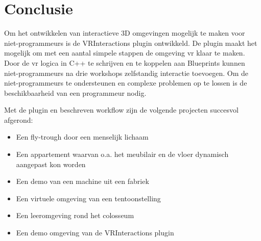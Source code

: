 \chapter{Conclusie}
\label{ch:conclusie}

Om het ontwikkelen van interactieve 3D omgevingen mogelijk te maken voor niet-programmeurs is de VRInteractions plugin ontwikkeld. De plugin maakt het mogelijk om met een aantal simpele stappen de omgeving \gls{vr} klaar te maken. Door de \gls{vr} logica in C++ te schrijven en te koppelen aan Blueprints kunnen niet-programmeurs na drie workshops zelfstandig interactie toevoegen. Om de niet-programmeurs te ondersteunen en complexe problemen op te lossen is de beschikbaarheid van een programmeur nodig.

Met de plugin en beschreven workflow zijn de volgende projecten succesvol afgerond:

\begin{itemize}
	\item Een fly-trough door een menselijk lichaam
	\item Een appartement waarvan o.a. het meubilair en de vloer dynamisch aangepast kon worden
	\item Een demo van een machine uit een fabriek
	\item Een virtuele omgeving van een tentoonstelling
	\item Een leeromgeving rond het colosseum
	\item Een demo omgeving van de VRInteractions plugin
\end{itemize}